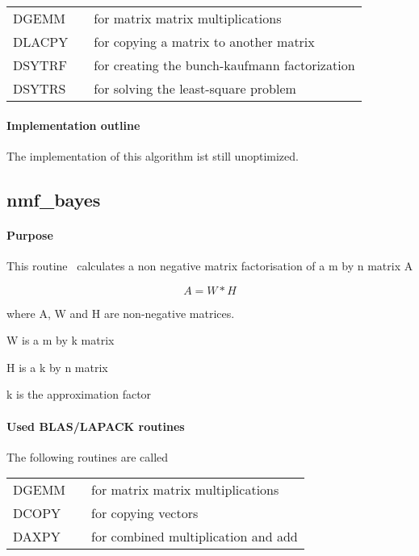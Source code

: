 \documentclass[a4paper,10pt]{scrartcl}
\begin{document}
					\begin{tabular}{lcl}
						DGEMM  && for matrix matrix multiplications\\
						DLACPY && for copying a matrix to another matrix\\
						DSYTRF && for creating the bunch-kaufmann factorization\\
						DSYTRS && for solving the least-square problem
					\end{tabular}

			\paragraph{Implementation outline}


					The implementation of this algorithm ist still unoptimized.


		\subsection{nmf\_bayes}

			\paragraph{Purpose}

					This routine~\cite{schmidt2008} calculates a non negative matrix factorisation of a m by n 
					matrix A\newline
					
					\begin{equation*}
						A = W * H
					\end{equation*}

 					where A, W and H are non-negative matrices.

 					W is a m by k matrix

 					H is a k by n matrix

 					k is the approximation factor

			\paragraph{Used BLAS/LAPACK routines}

					The following routines are called\newline

					\begin{tabular}{lcl}
						DGEMM  && for matrix matrix multiplications\\
						DCOPY && for copying vectors\\
						DAXPY && for combined multiplication and add\\
					\end{tabular}
\end{document}
